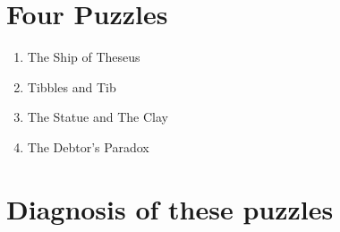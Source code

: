 \documentclass[9pt]{article}
\begin{document}
\section{Four Puzzles} 
\begin{enumerate}
\item The Ship of Theseus 
\item Tibbles and Tib 
\item The Statue and The Clay 
\item The Debtor's Paradox 

\end{enumerate}

\section{Diagnosis of these puzzles}
\end{document}
